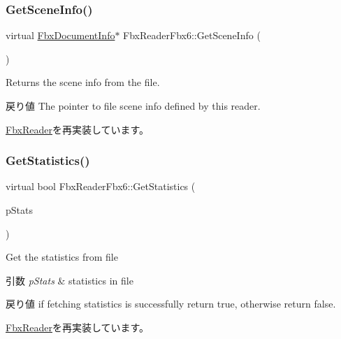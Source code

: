 \subsubsection{\texorpdfstring{Get\+Scene\+Info()}{GetSceneInfo()}}
{\footnotesize\ttfamily virtual \hyperlink{class_fbx_document_info}{Fbx\+Document\+Info}$\ast$ Fbx\+Reader\+Fbx6\+::\+Get\+Scene\+Info (\begin{DoxyParamCaption}{ }\end{DoxyParamCaption})\hspace{0.3cm}{\ttfamily [virtual]}}

Returns the scene info from the file. \begin{DoxyReturn}{戻り値}
The pointer to file scene info defined by this reader. 
\end{DoxyReturn}


\hyperlink{class_fbx_reader_acb928634641ad5f99d709478c7a234be}{Fbx\+Reader}を再実装しています。

\mbox{\label{class_fbx_reader_fbx6_a72865fb347314f30b81b56767fe91a5b}} 
\subsubsection{\texorpdfstring{Get\+Statistics()}{GetStatistics()}}
{\footnotesize\ttfamily virtual bool Fbx\+Reader\+Fbx6\+::\+Get\+Statistics (\begin{DoxyParamCaption}\item[{\hyperlink{class_fbx_statistics}{Fbx\+Statistics} $\ast$}]{p\+Stats }\end{DoxyParamCaption})\hspace{0.3cm}{\ttfamily [virtual]}}

Get the statistics from file 
\begin{DoxyParams}{引数}
{\em p\+Stats} & statistics in file \\
\hline
\end{DoxyParams}
\begin{DoxyReturn}{戻り値}
if fetching statistics is successfully return {\ttfamily true}, otherwise return {\ttfamily false}. 
\end{DoxyReturn}


\hyperlink{class_fbx_reader_ae14762357b4a8ecce10a266b06cc3117}{Fbx\+Reader}を再実装しています。

